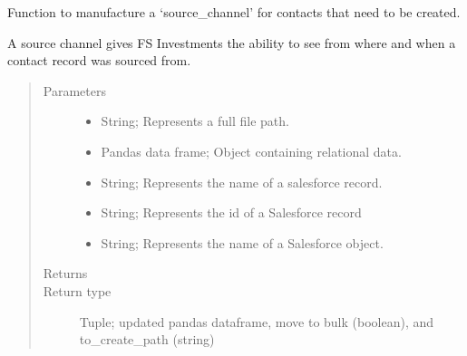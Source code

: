 \documentclass[letterpaper,10pt,english]{sphinxmanual}
\begin{document}
\begin{fulllineitems}
\label{\detokenize{index:ListManagement.sources.accounts.make_sc}}
Function to manufacture a ‘source\_channel’ for contacts
that need to be created.

A source channel gives FS Investments the ability to see
from where and when a contact record was sourced from.
\begin{quote}\begin{description}
\item[{Parameters}] \leavevmode\begin{itemize}
\item {} 
 \textendash{} String; Represents a full file path.

\item {} 
 \textendash{} Pandas data frame; Object containing relational data.

\item {} 
 \textendash{} String; Represents the name of a salesforce record.

\item {} 
 \textendash{} String; Represents the id of a Salesforce record

\item {} 
 \textendash{} String; Represents the name of a Salesforce object.

\end{itemize}

\item[{Returns}] \leavevmode


\item[{Return type}] \leavevmode
Tuple; updated pandas dataframe, move to bulk (boolean), and to\_create\_path (string)

\end{description}\end{quote}

\end{fulllineitems}

\end{document}
